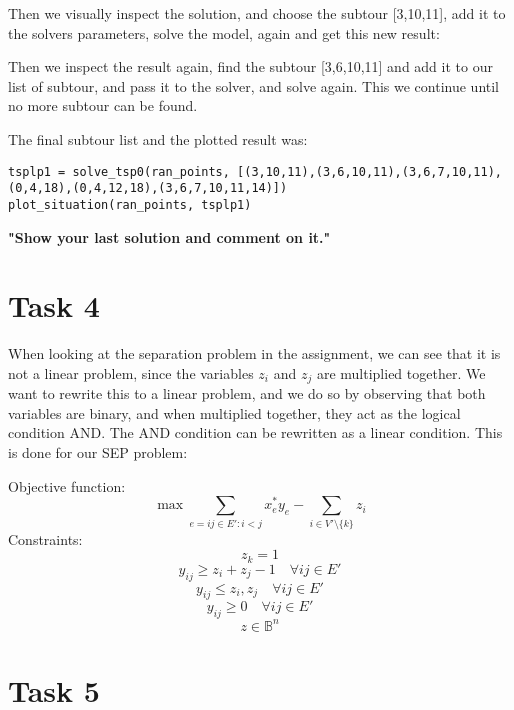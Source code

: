 \documentclass[a4paper,10pt]{article}
\begin{document}
Then we visually inspect the solution, and choose the subtour [3,10,11], add it to the solvers parameters, solve the model, again and get this new result:

\begin{figure}[htb]
\begin{center}
\end{center}
\end{figure}

Then we inspect the result again, find the subtour [3,6,10,11] and add it to our list of subtour, and pass it to the solver, and solve again. This we continue until no more subtour can be found.

The final subtour list and the plotted result was:

\begin{lstlisting}
tsplp1 = solve_tsp0(ran_points, [(3,10,11),(3,6,10,11),(3,6,7,10,11),(0,4,18),(0,4,12,18),(3,6,7,10,11,14)])
plot_situation(ran_points, tsplp1)
\end{lstlisting}

\begin{figure}[htb]
\begin{center}
\end{center}
\end{figure}

\textbf{"Show your last solution and comment on it."}


\newpage
\section*{Task 4}

When looking at the separation problem in the assignment, we can see that it is not a linear problem, since the variables $z_i$ and $z_j$ are multiplied together. We want to rewrite this to a linear problem, and we do so by observing that both variables are binary, and when multiplied together, they act as the logical condition AND. The AND condition can be rewritten as a linear condition. This is done for our SEP problem:

Objective function:
$$ \max \sum_{e=ij\in E':i < j} x^*_e y_e - \sum_{i \in V' \setminus \{k\}} z_i $$
Constraints:
$$ z_k = 1 $$
$$ y_{ij} \geq z_i + z_j - 1 \quad \forall ij \in E' $$
$$ y_{ij} \leq z_i,z_j \quad \forall ij \in E' $$
$$ y_{ij} \geq 0 \quad \forall ij \in E' $$
$$ z \in \mathbb{B}^n $$


\newpage
\section*{Task 5}
\end{document}
